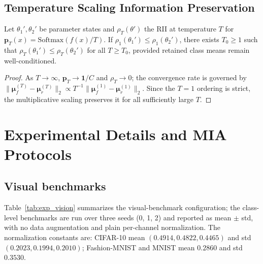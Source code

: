 \documentclass[smallextended]{svjour3}       %
\begin{document}
\subsection{Temperature Scaling Information Preservation}
\label{app:temp}
\begin{proposition}
\label{prop:rank_preserve}
Let $\theta_1',\theta_2'$ be parameter states and $\rho_T(\theta')$ the RII at temperature $T$ for $\mathbf{p}_T(x)=\mathrm{Softmax}(f(x)/T)$. If $\rho_1(\theta_1') \le \rho_1(\theta_2')$, there exists $T_0\ge1$ such that $\rho_T(\theta_1') \le \rho_T(\theta_2')$ for all $T\ge T_0$, provided retained class means remain well-conditioned.
\end{proposition}
\begin{proof}
As $T\to\infty$, $\mathbf{p}_T\to\mathbf{1}/C$ and $\rho_T\to0$; the convergence rate is governed by $\|\boldsymbol{\mu}_f^{(T)}-\boldsymbol{\mu}_r^{(T)}\|_2\propto T^{-1}\|\boldsymbol{\mu}_f^{(1)}-\boldsymbol{\mu}_r^{(1)}\|_2$. Since the $T=1$ ordering is strict, the multiplicative scaling preserves it for all sufficiently large $T$.
\end{proof}

\section{Experimental Details and MIA Protocols}
\label{app:details}

\subsection{Visual benchmarks}

Table~\ref{tab:exp_vision} summarizes the visual-benchmark configuration; the class-level benchmarks are run over three seeds (0, 1, 2) and reported as mean $\pm$ std, with no data augmentation and plain per-channel normalization. The normalization constants are: CIFAR-10 mean $(0.4914,0.4822,0.4465)$ and std $(0.2023,0.1994,0.2010)$; Fashion-MNIST and MNIST mean $0.2860$ and std $0.3530$.
\end{document}

